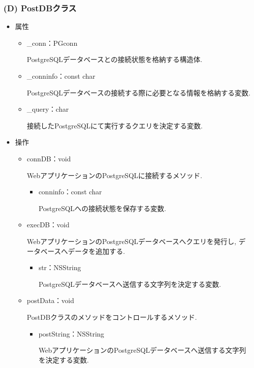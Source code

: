 \subsubsection{(D) PostDBクラス}
\begin{itemize}
\item 属性

\begin{itemize}
\item \_conn：PGconn

PostgreSQLデータベースとの接続状態を格納する構造体.

\item \_conninfo：const char

PostgreSQLデータベースの接続する際に必要となる情報を格納する変数.

\item \_query：char

接続したPostgreSQLにて実行するクエリを決定する変数.
\end{itemize}

\item 操作

\begin{itemize}
\item connDB：void

WebアプリケーションのPostgreSQLに接続するメソッド.
\begin{itemize}
\item conninfo：const char

PostgreSQLへの接続状態を保存する変数.
\end{itemize}

\item execDB：void

WebアプリケーションのPostgreSQLデータベースへクエリを発行し, データベースへデータを追加する.
\begin{itemize}
\item str：NSString

PostgreSQLデータベースへ送信する文字列を決定する変数.
\end{itemize}

\item postData：void

PostDBクラスのメソッドをコントロールするメソッド.
\begin{itemize}
\item postString：NSString

WebアプリケーションのPostgreSQLデータベースへ送信する文字列を決定する変数.
\end{itemize}

\end{itemize}

\end{itemize}

